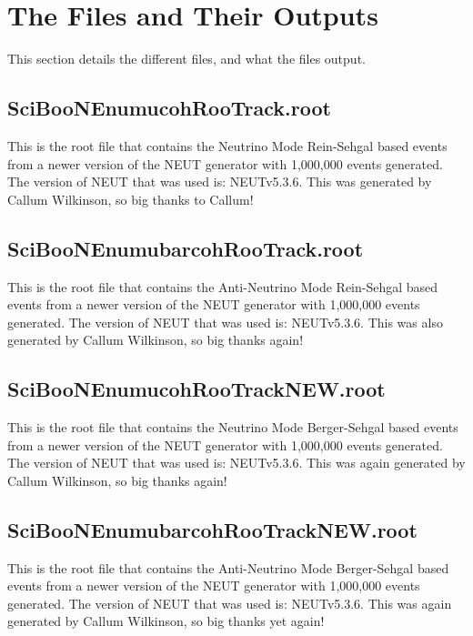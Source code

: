 \documentclass[11pt]{article}
\begin{document}
\section{The Files and Their Outputs}
This section details the different files, and what the files output. 

\subsection{SciBooNE\textunderscore numu\textunderscore coh\textunderscore RooTrack.root}
This is the root file that contains the Neutrino Mode Rein-Sehgal based events from a newer version of the NEUT generator with 1,000,000 events generated. The version of NEUT that was used is: NEUTv5.3.6. This was generated by Callum Wilkinson, so big thanks to Callum!

\subsection{SciBooNE\textunderscore numubar\textunderscore coh\textunderscore RooTrack.root}
This is the root file that contains the Anti-Neutrino Mode Rein-Sehgal based events from a newer version of the NEUT generator with 1,000,000 events generated. The version of NEUT that was used is: NEUTv5.3.6. This was also generated by Callum Wilkinson, so big thanks again!

\subsection{SciBooNE\textunderscore numu\textunderscore coh\textunderscore RooTrack\textunderscore NEW.root}
This is the root file that contains the Neutrino Mode Berger-Sehgal based events from a newer version of the NEUT generator with 1,000,000 events generated. The version of NEUT that was used is: NEUTv5.3.6. This was again generated by Callum Wilkinson, so big thanks again!

\subsection{SciBooNE\textunderscore numubar\textunderscore coh\textunderscore RooTrack\textunderscore NEW.root}
This is the root file that contains the Anti-Neutrino Mode Berger-Sehgal based events from a newer version of the NEUT generator with 1,000,000 events generated. The version of NEUT that was used is: NEUTv5.3.6. This was again generated by Callum Wilkinson, so big thanks yet again!
\end{document}
